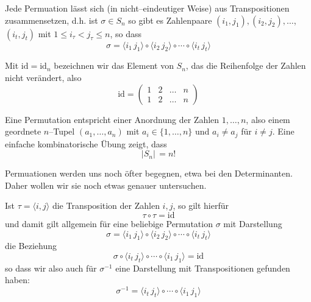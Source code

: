 \begin{beispiel}
Jede Permuation lässt sich (in nicht--eindeutiger Weise) aus Transpositionen zusammensetzen, d.h. ist 
$\sigma \in S_n$ so gibt es Zahlenpaare $(i_1, j_1), (i_2, j_2), \ldots$, $(i_t, j_t)$ mit $1 \leq i_{\tau}
< j_{\tau} \leq n$, so dass
  	$$ \sigma = \langle i_1 \, j_1 \rangle \circ \langle i_2 \, j_2 \rangle \circ \cdots \circ 
	\langle i_t \, j_t \rangle $$

Mit $\mathrm{id} = \mathrm{id}_n$ bezeichnen wir das Element von $S_n$, das die Reihenfolge der Zahlen nicht 
verändert, also 
  	$$ \textrm{id} = \left( \begin{matrix} 1 & 2 & \ldots & n \\  1 & 2 & \ldots & n \end{matrix} \right) $$


\medbreak

Eine Permutation entspricht einer Anordnung der Zahlen $1, \ldots, n$, also einem geordnete $n$--Tupel 
$(a_1, \ldots, a_n)$ mit $a_i  \in \{1, \ldots, n \}$ und $a_i \neq a_j$ für $i \neq j$. 
Eine einfache kombinatorische Übung zeigt, dass 
  	$$ \vert S_n \vert \, = n ! $$
\medbreak

Permuationen werden uns noch öfter begegnen, etwa bei den Determinanten. Daher 
wollen wir sie noch etwas genauer untersuchen.

Ist $\tau = \langle i, j \rangle$ die Transposition der Zahlen $i,j$, so gilt hierfür
  	$$ \tau \circ \tau = \textrm{id} $$
und damit gilt allgemein für eine beliebige Permutation $\sigma$ mit Darstellung
  	$$ \sigma  = \langle i_1 \, j_1 \rangle \circ \langle i_2 \, j_2 \rangle \circ \cdots \circ 
	\langle i_t \, j_t \rangle $$
die Beziehung
  	$$ \sigma \circ \langle i_t \, j_t \rangle \circ \cdots \circ \langle i_1 \, j_1 \rangle = \mathrm{id} $$
so dass wir also auch für $\sigma^{-1}$ eine Darstellung mit Transpositionen gefunden haben:
  	$$ \sigma^{-1} = \langle i_t \, j_t \rangle \circ \cdots \circ \langle i_1 \, j_1 \rangle  $$


\end{beispiel}
